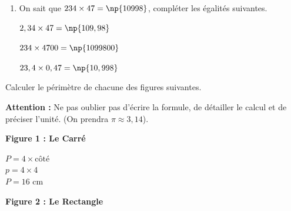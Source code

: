 \documentclass[a4paper]{book}
\begin{document}
{\begin{exercice}
\begin{enumerate}
\begin{minipage}{0.33\linewidth}
            \end{minipage}

            \item On sait que $234 \times 47 = \np{10998}$, compléter les égalités suivantes.

            \medskip
        
            \begin{minipage}{0.33\linewidth}
                $2,34 \times 47 = \np{109,98}$
            \end{minipage}
            \hfill\vline\hfill
            \begin{minipage}{0.33\linewidth}
                \quad $234 \times 4700 = \np{1099800}$
            \end{minipage}        
            \hfill\vline\hfill
            \begin{minipage}{0.33\linewidth}
                $23,4 \times 0,47 = \np{10,998}$
            \end{minipage}
        \end{enumerate}
    \end{exercice}


    \begin{exercice}
        Calculer le périmètre de chacune des figures suivantes.
        
        \textbf{Attention :} Ne pas oublier pas d'écrire la formule, de détailler le calcul et de préciser l'unité. (On prendra $\pi \approx 3,14$).

        \medskip

        \begin{minipage}{0.33\linewidth}
            \centering
            \textbf{Figure 1 : Le Carré} \\
            \vspace{0.3cm}
            
            \medskip
            \raggedright
            
            $P=4\times\text{côté}$\\
            $p=4\times4$\\
            $P=16$ cm
        \end{minipage}
        \hfill\vline\hfill
        \begin{minipage}{0.33\linewidth}
            \centering
            \textbf{Figure 2 : Le Rectangle} \\
            \vspace{0.3cm}


\end{minipage}
\end{exercice}}
\end{document}
